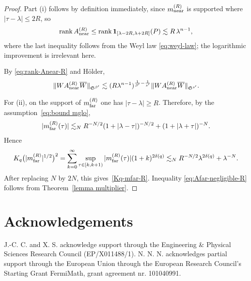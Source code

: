 \documentclass[12pt,reqno,a4paper]{amsart}
\begin{document}
\begin{proof}
  Part (i) follows by definition immediately, since \(m_{\rm near}^{(R)}\) is supported where
  \(|\tau-\lambda|\leq 2R\), so
  \[
    \operatorname{rank}A_{\rm near}^{(R)}
    \leq
    \operatorname{rank}\mathbf{1}_{[\lambda-2R,\lambda+2R]}(P)
    \lesssim R\,\lambda^{n-1},
  \]
  where the last inequality follows from the Weyl law \eqref{eq:weyl-law}; the logarithmic improvement is irrelevant here.

  By \eqref{eq:rank-Anear-R} and H\"older,
  \[
    \|WA_{\rm near}^{(R)}\overline{W}\|_{\mathfrak{S}^{\beta'}}
    \lesssim
    (R\lambda^{n-1})^{\frac1{\beta'}-\frac1{s'}}
    \|WA_{\rm near}^{(R)}\overline{W}\|_{\mathfrak{S}^{s'}}.
  \]

  For (ii), on the support of \(m_{\rm far}^{(R)}\) one has \(|\tau-\lambda|\geq R\). Therefore, by the assumption~\eqref{eq:bound mglo},
  \[
    |m_{\rm far}^{(R)}(\tau)|
    \lesssim_N    R^{-N/2}(1+|\lambda-\tau|)^{-N/2}+(1+|\lambda+\tau|)^{-N}.
  \]
  Hence
  \begin{align*}
    K_q\big(|m_{\rm far}^{(R)}|^{1/2}\big)^2
    =
    \sum_{k=0}^\infty
    \sup_{\tau\in[k,k+1)}|m_{\rm far}^{(R)}(\tau)|
    (1+k)^{2\delta(q)} 
    \lesssim_N
    R^{-N/2}\lambda^{2\delta(q)}+\lambda^{-N}.
  \end{align*}
  After replacing \(N\) by \(2N\), this gives~\eqref{Kq-mfar-R}. Inequality \eqref{eq:Afar-negligible-R} follows from Theorem~\ref{lemma multiplier}.
\end{proof}

\section*{Acknowledgements}
 J.-C. C. and X. S. acknowledge support through the Engineering \& Physical Sciences Research Council (EP/X011488/1).
 N. N. N. acknowledges partial support through the European Union through the European Research Council’s Starting Grant FermiMath, grant agreement nr. 101040991.


%

\end{document}
